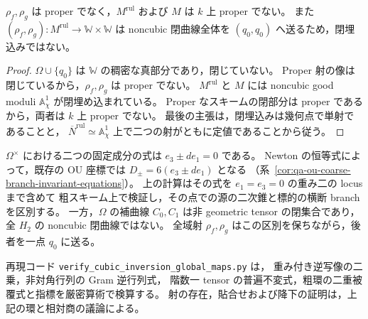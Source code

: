 \begin{corollary}
\label{cor:qa-global-good-moduli-nonproper}
$\rho_f,\rho_g$ は proper でなく，$M^{\mathrm{rul}}$ および $M$ は
$k$ 上 proper でない。
また $(\rho_f,\rho_g):M^{\mathrm{rul}}\to\mathbb W\times\mathbb W$ は
noncubic 閉曲線全体を $(q_0,q_0)$ へ送るため，閉埋込みではない。
\end{corollary}
\begin{proof}
$\Omega\cup\{q_0\}$ は $\mathbb W$ の稠密な真部分であり，閉じていない。
Proper 射の像は閉じているから，$\rho_f,\rho_g$ は proper でない。
$M^{\mathrm{rul}}$ と $M$ には noncubic good moduli
$\mathbb A^1_\chi$ が閉埋め込まれている。
Proper なスキームの閉部分は proper であるから，両者は $k$ 上 proper でない。
最後の主張は，閉埋込みは幾何点で単射であることと，
$\overline N^{\mathrm{rul}}\simeq\mathbb A^1_\chi$ 上で二つの射がともに定値であることから従う。
\end{proof}

\begin{remark}[既存分岐式との一致]
$\Omega^\times$ における二つの固定成分の式は
$e_3\pm de_1=0$ である。
Newton の恒等式によって，既存の OU 座標では
$D_\pm=6(e_3\pm de_1)$ となる
（系~\ref{cor:qa-ou-coarse-branch-invariant-equations}）。
上の計算はその式を $e_1=e_3=0$ の重み二の locus まで含めて
粗スキーム上で検証し，その点での源の二次錐と標的の横断 branch を区別する。
一方，$\Omega$ の補曲線 $C_0,C_1$ は非 geometric tensor の閉集合であり，
全 $H_2$ の noncubic 閉曲線ではない。
全域射 $\rho_f,\rho_g$ はこの区別を保ちながら，後者を一点 $q_0$ に送る。

再現コード \texttt{verify\_cubic\_inversion\_global\_maps.py} は，
重み付き逆写像の二乗，非対角行列の Gram 逆行列式，
階数一 tensor の普遍不変式，粗環の二重被覆式と指標を厳密算術で検算する。
射の存在，貼合せおよび降下の証明は，上記の環と相対商の議論による。
\end{remark}
